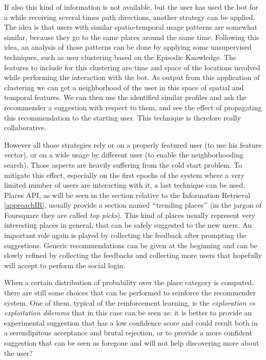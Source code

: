 If also this kind of information is not available, but the user has used the bot for a while receiving several times path directions, another strategy can be applied. The idea is that users with similar spatio-temporal usage patterns are somewhat similar, because they go to the same places around the same time. Following this idea, an analysis of those patterns can be done by applying some unsupervised techniques, such as user clustering based on the Episodic Knowledge. The features to include for this clustering are time and space of the locations involved while performing the interaction with the bot. As output from this application of clustering we can get a neighborhood of the user in this space of spatial and temporal features. We can then use the identified similar profiles and ask the recommender a suggestion with respect to them, and see the effect of propagating this recommendation to the starting user. This technique is therefore really collaborative.

However all those strategies rely or on a properly featured user (to use his feature vector), or on a wide usage by different user (to enable the neighborhooding search). Those aspects are heavily suffering from the cold start problem. To mitigate this effect, especially on the first epochs of the system where a very limited number of users are interacting with it, a last technique can be used. Places API, as will be seen in the section relative to the Information Retrieval \ref{approachIR}, usually provide a section named $``$trending places$"$  (in the jargon of Foursquare they are called \textit{top picks}). This kind of places usually represent very interesting places in general, that can be safely suggested to the new users. An important role again is played by collecting the feedback after prompting the suggestions. Generic recommendations can be given at the beginning and can be slowly refined by collecting the feedbacks and collecting more users that hopefully will accept to perform the social login.

When a certain distribution of probability over the place category is computed, there are still some choices that can be performed to reinforce the recommender system. One of them, typical of the reinforcement learning, is the \textit{exploration vs exploitation dilemma} that in this case can be seen as: it is better to provide an experimental suggestion that has a low confidence score and could result both in a serendipitous acceptance and brutal rejection, or to provide a more confident suggestion that can be seen as foregone and will not help discovering more about the user? 

